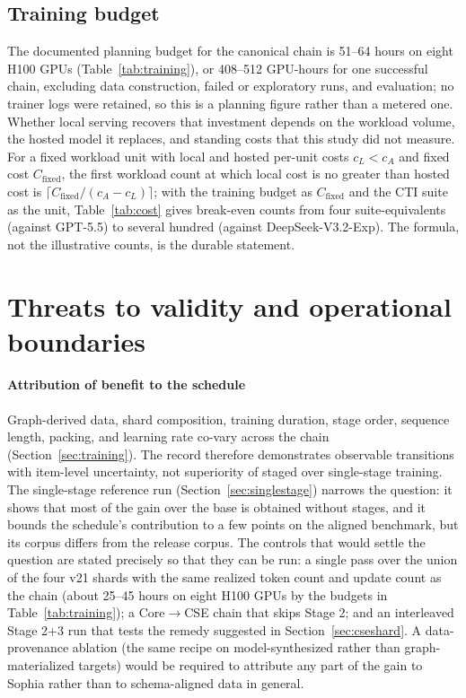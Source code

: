 \documentclass[preprint,12pt,authoryear]{elsarticle}
\begin{document}
\subsection{Training budget}
The documented planning budget for the canonical chain is 51--64 hours on eight H100 GPUs (Table~\ref{tab:training}), or 408--512 GPU-hours for one successful chain, excluding data construction, failed or exploratory runs, and evaluation; no trainer logs were retained, so this is a planning figure rather than a metered one. Whether local serving recovers that investment depends on the workload volume, the hosted model it replaces, and standing costs that this study did not measure. For a fixed workload unit with local and hosted per-unit costs $c_L<c_A$ and fixed cost $C_{\mathrm{fixed}}$, the first workload count at which local cost is no greater than hosted cost is $\lceil C_{\mathrm{fixed}}/(c_A-c_L)\rceil$; with the training budget as $C_{\mathrm{fixed}}$ and the CTI suite as the unit, Table~\ref{tab:cost} gives break-even counts from four suite-equivalents (against GPT-5.5) to several hundred (against DeepSeek-V3.2-Exp). The formula, not the illustrative counts, is the durable statement.

\section{Threats to validity and operational boundaries}\label{sec:limits}
\paragraph{Attribution of benefit to the schedule}
Graph-derived data, shard composition, training duration, stage order, sequence length, packing, and learning rate co-vary across the chain (Section~\ref{sec:training}). The record therefore demonstrates observable transitions with item-level uncertainty, not superiority of staged over single-stage training. The single-stage reference run (Section~\ref{sec:singlestage}) narrows the question: it shows that most of the gain over the base is obtained without stages, and it bounds the schedule's contribution to a few points on the aligned benchmark, but its corpus differs from the release corpus. The controls that would settle the question are stated precisely so that they can be run: a single pass over the union of the four v21 shards with the same realized token count and update count as the chain (about 25--45 hours on eight H100 GPUs by the budgets in Table~\ref{tab:training}); a Core$\rightarrow$CSE chain that skips Stage 2; and an interleaved Stage 2+3 run that tests the remedy suggested in Section~\ref{sec:cseshard}. A data-provenance ablation (the same recipe on model-synthesized rather than graph-materialized targets) would be required to attribute any part of the gain to Sophia rather than to schema-aligned data in general.
\end{document}
